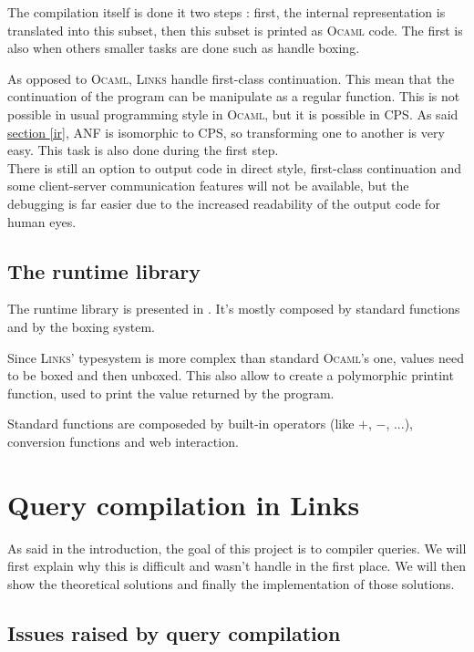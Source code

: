 \documentclass[11pt]{article}
\newcommand\mysc[1]{{\rmfamily\textsc{#1}}\xspace}
\newcommand\links{\mysc{Links}}
\newcommand\ocaml{\mysc{Ocaml}}
\newcommand\refsec[1]{\hyperref[#1]{section \ref*{#1}}}
\begin{document}
The compilation itself is done it two steps : first, the internal representation is translated into this subset, then this subset is printed as \ocaml code. The first is also when others smaller tasks are done such as handle boxing.

As opposed to \ocaml, \links handle first-class continuation. This mean that the continuation of the program can be manipulate as a regular function. This is not possible in usual programming style in \ocaml, but it is possible in CPS. 
As said \refsec{ir}, ANF is isomorphic to CPS, so transforming one to another is very easy. This task is also done during the first step.\\
There is still an option to output code in direct style, first-class continuation and some client-server communication features will not be available, but the debugging is far easier due to the increased readability of the output code for human eyes.

\subsection{The runtime library\label{runtime}}

The runtime library is presented in \cite{links:comp}. It's mostly composed by standard functions and by the boxing system. 

Since \links' typesystem is more complex than standard \ocaml's one, values need to be boxed and then unboxed. This also allow to create a polymorphic printint function, used to print the value returned by the program.

Standard functions are composeded by built-in operators (like $+$, $-$, ...), conversion functions and web interaction.

\section{Query compilation in Links}

As said in the introduction, the goal of this project is to compiler queries. We will first explain why this is difficult and wasn't handle in the first place. We will then show the theoretical solutions and finally the implementation of those solutions.

\subsection{Issues raised by query compilation}
\end{document}
